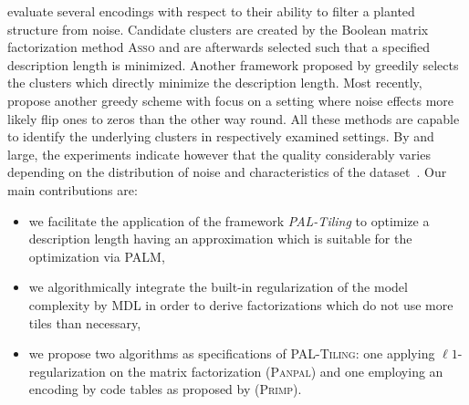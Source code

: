 \cite{miettinen2014mdl4bmf} evaluate several encodings with respect to their ability to filter a planted structure from noise. Candidate clusters are created by the Boolean matrix factorization method \textsc{Asso} and are afterwards selected such that a specified description length is minimized. Another framework proposed by \cite{lucchese2014unifying} greedily selects the clusters which directly minimize the description length. Most recently, \cite{karaev2015getting} propose another greedy scheme with focus on a setting where noise effects more likely flip ones to zeros than the other way round. All these methods are capable to identify the underlying clusters in respectively examined settings. By and large, the experiments indicate however that the quality considerably varies depending on the distribution of noise and characteristics of the dataset~\citep{miettinen2014mdl4bmf,karaev2015getting}.  Our main contributions are:
\begin{itemize}
    \item we facilitate the application of the framework \emph{PAL-Tiling} to optimize a description length having an approximation which is suitable for the optimization via PALM, \item we algorithmically integrate the built-in regularization of the model complexity by MDL in order to derive factorizations which do not use more tiles than necessary,
    \item we propose two algorithms as specifications of \textsc{PAL-Tiling}: one applying $\ell 1$-regularization on the matrix factorization (\textsc{Panpal}) and one employing an encoding by code tables as proposed by \cite{siebes2006item} (\textsc{Primp}). 
\end{itemize}
 
